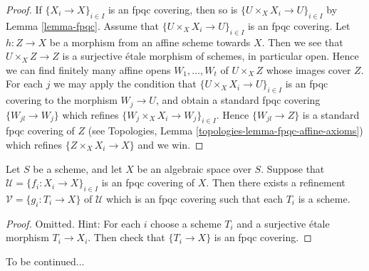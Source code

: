 \begin{proof}
If $\{X_i \to X\}_{i \in I}$ is an fpqc covering, then so is
$\{U \times_X X_i \to U\}_{i \in I}$ by Lemma \ref{lemma-fpqc}.
Assume that $\{U \times_X X_i \to U\}_{i \in I}$ is an fpqc covering.
Let $h : Z \to X$ be a morphism from an affine scheme towards $X$.
Then we see that $U \times_X Z \to Z$ is a surjective \'etale morphism
of schemes, in particular open. Hence we can find finitely many affine opens
$W_1, \ldots, W_t$ of $U \times_X Z$ whose images cover $Z$.
For each $j$ we may apply the condition that
$\{U \times_X X_i \to U\}_{i \in I}$ is an fpqc covering
to the morphism $W_j \to U$, and obtain a standard fpqc covering
$\{W_{jl} \to W_j\}$ which refines $\{W_j \times_X X_i \to W_j\}_{i \in I}$.
Hence $\{W_{jl} \to Z\}$ is a standard fpqc covering of $Z$
(see
Topologies, Lemma \ref{topologies-lemma-fpqc-affine-axioms})
which refines $\{Z \times_X X_i \to X\}$ and we win.
\end{proof}

\begin{lemma}
\label{lemma-refine-fpqc-schemes}
Let $S$ be a scheme, and let $X$ be an algebraic space over $S$.
Suppose that $\mathcal{U} = \{f_i : X_i \to X\}_{i \in I}$ is an
fpqc covering of $X$. Then there exists a refinement
$\mathcal{V} = \{g_i : T_i \to X\}$ of $\mathcal{U}$ which is an
fpqc covering such that each $T_i$ is a scheme.
\end{lemma}

\begin{proof}
Omitted. Hint: For each $i$ choose a scheme $T_i$ and a surjective \'etale
morphism $T_i \to X_i$. Then check that $\{T_i \to X\}$ is an fpqc covering.
\end{proof}

\noindent
To be continued...












